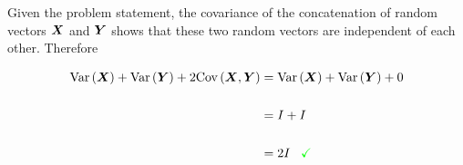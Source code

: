 Given the problem statement, the covariance of the concatenation of random vectors $\boldsymbol{X}$ and $\boldsymbol{Y}$ shows that these two random vectors are independent of each other. Therefore

\begin{align*}
	\textrm{Var}\left(\boldsymbol{X}\right) + \textrm{Var}\left(\boldsymbol{Y}\right) + 2\textrm{Cov}\left(\boldsymbol{X},\boldsymbol{Y}\right) &= \textrm{Var}\left(\boldsymbol{X}\right) + \textrm{Var}\left(\boldsymbol{Y}\right) + 0 \\
	\\
	&= I + I \\
	\\
	&= 2I \,\,\,\,\, \textcolor{green}{\checkmark}
\end{align*} 



